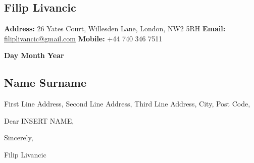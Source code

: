 \documentclass[a4paper,12pt]{article}
\date{}
\begin{document}
\subsection*{\hfill{Filip Livancic}}

\begin{flushright}

    \textbf{Address: }26 Yates Court,    Willesden Lane,  \linebreak
		  London, NW2 5RH \linebreak
    \textbf{Email: }\href{mailto:filiplivancic@gmail.com}{filiplivancic@gmail.com} \linebreak
    \textbf{Mobile: }+44 740 346 7511 \linebreak

\end{flushright}

\begin{flushleft}
	\textbf{Day Month Year}
\newline
	\subsection*{Name Surname}
First Line Address,\newline
Second Line Address,\newline
Third Line Address,\newline
City, Post Code,\newline
\end{flushleft}

\hrulefill


\begin{flushleft}

Dear INSERT NAME,\newline


Sincerely,\newline

Filip Livancic

\end{flushleft}
\end{document}
